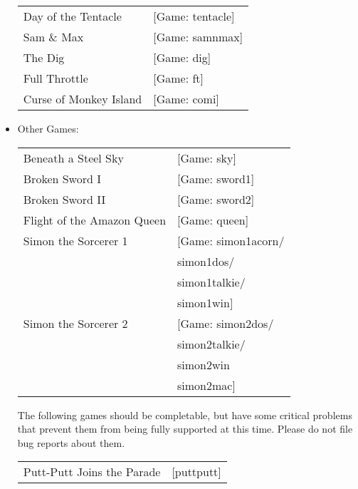 \begin{itemize}
\begin {tabular} [h] {ll}
    Day of the Tentacle&                           [Game: tentacle]\\
    Sam \& Max&                                    [Game: samnmax]\\
    The Dig&                                       [Game: dig]\\
    Full Throttle&                                 [Game: ft]\\
    Curse of Monkey Island&                        [Game: comi]\\
  \end{tabular}
\item Other Games:\\ 
  \begin{tabular}[h]{ll}
     Beneath a Steel Sky&                             [Game: sky]\\
    Broken Sword I&                                [Game: sword1]\\
    Broken Sword II&                               [Game: sword2]\\
    Flight of the Amazon Queen&                    [Game: queen]\\
     Simon the Sorcerer 1&                         [Game: simon1acorn/\\
     &                                                    simon1dos/\\
     &                                                    simon1talkie/\\
     &                                                    simon1win]\\
     Simon the Sorcerer 2&                         [Game: simon2dos/\\
     &                                                    simon2talkie/\\
     &                                                    simon2win\\
     &                                                    simon2mac]\\
  \end{tabular}

The following games should be completable, but have some critical problems that
prevent them from being fully supported at this time. Please do not file bug
reports about them.

  \begin{tabular}[h]{ll}
	Putt-Putt Joins the Parade& [puttputt]\\
  \end{tabular}


\end{itemize}
